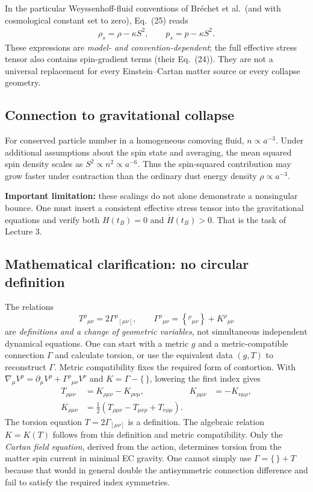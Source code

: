 \documentclass[11pt,a4paper]{article}
\begin{document}
In the particular Weyssenhoff-fluid conventions of Br\'echet et al.\ (and with cosmological constant set to zero), Eq.~(25) reads
\begin{align}
\boxed{\rho_s=\rho-\kappa S^2},\qquad
\boxed{p_s=p-\kappa S^2}.
\end{align}
These expressions are \emph{model- and convention-dependent}; the full effective stress tensor also contains spin-gradient terms (their Eq.~(24)). They are not a universal replacement for every Einstein--Cartan matter source or every collapse geometry.

\subsection{Connection to gravitational collapse}
For conserved particle number in a homogeneous comoving fluid, $n\propto a^{-3}$. Under additional assumptions about the spin state and averaging, the mean squared spin density scales as $S^2\propto n^2\propto a^{-6}$. Thus the spin-squared contribution may grow faster under contraction than the ordinary dust energy density $\rho\propto a^{-3}$.

\textbf{Important limitation:} these scalings do not alone demonstrate a nonsingular bounce. One must insert a consistent effective stress tensor into the gravitational equations and verify both $H(t_B)=0$ and $\dot H(t_B)>0$. That is the task of Lecture 3.

\subsection{Mathematical clarification: no circular definition}
The relations
\begin{equation}
T^\rho{}_{\mu\nu}=2\Gamma^\rho{}_{[\mu\nu]},\qquad
\Gamma^\rho{}_{\mu\nu}=\left\{^\rho{}_{\mu\nu}\right\}+K^\rho{}_{\mu\nu}
\end{equation}
are \emph{definitions and a change of geometric variables}, not simultaneous independent dynamical equations. One can start with a metric $g$ and a metric-compatible connection $\Gamma$ and calculate torsion, or use the equivalent data $(g,T)$ to reconstruct $\Gamma$. Metric compatibility fixes the required form of contortion. With $\nabla_\mu V^\rho=\partial_\mu V^\rho+\Gamma^\rho{}_{\mu\nu}V^\nu$ and $K=\Gamma-\{\,\}$, lowering the first index gives
\begin{align}
T_{\rho\mu\nu}&=K_{\rho\mu\nu}-K_{\rho\nu\mu},&
K_{\rho\mu\nu}&=-K_{\nu\mu\rho},\\
\boxed{K_{\rho\mu\nu}}&=
\boxed{\frac12\left(T_{\rho\mu\nu}-T_{\mu\nu\rho}+T_{\nu\rho\mu}\right)}.
\end{align}
The torsion equation $T=2\Gamma_{[\mu\nu]}$ is a definition. The algebraic relation $K=K(T)$ follows from this definition and metric compatibility. Only the \emph{Cartan field equation}, derived from the action, determines torsion from the matter spin current in minimal EC gravity. One cannot simply use $\Gamma=\{\,\}+T$ because that would in general double the antisymmetric connection difference and fail to satisfy the required index symmetries.
\end{document}
